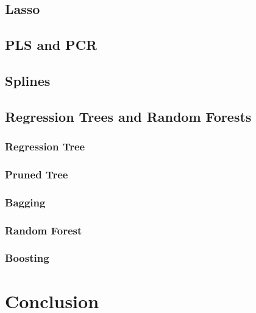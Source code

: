 \documentclass[11pt,]{article}
\begin{document}
\hypertarget{lasso}{%
\subsection{Lasso}\label{lasso}}

\hypertarget{pls-and-pcr}{%
\subsection{PLS and PCR}\label{pls-and-pcr}}

\hypertarget{splines}{%
\subsection{Splines}\label{splines}}

\hypertarget{regression-trees-and-random-forests}{%
\subsection{Regression Trees and Random
Forests}\label{regression-trees-and-random-forests}}

\hypertarget{regression-tree}{%
\subsubsection{Regression Tree}\label{regression-tree}}

\hypertarget{pruned-tree}{%
\subsubsection{Pruned Tree}\label{pruned-tree}}

\hypertarget{bagging}{%
\subsubsection{Bagging}\label{bagging}}

\hypertarget{random-forest}{%
\subsubsection{Random Forest}\label{random-forest}}

\hypertarget{boosting}{%
\subsubsection{Boosting}\label{boosting}}

\hypertarget{conclusion}{%
\section{Conclusion}\label{conclusion}}
\end{document}

